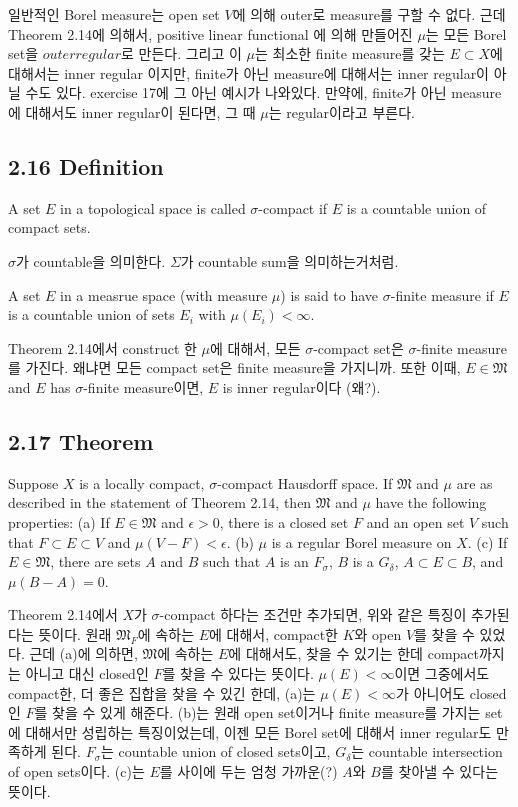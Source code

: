 \documentclass[11pt,reqno]{amsart}
\renewcommand{\(}{\left(}
\renewcommand{\)}{\right)}
\renewcommand{\[}{\left[}
\renewcommand{\]}{\right]}
\newcommand{\ep}{\epsilon}
\newcommand{\M}{\mathfrak{M}}
\begin{document}
일반적인 Borel measure는 open set $V$에 의해 outer로 measure를 구할 수 없다. 근데 Theorem 2.14에 의해서, positive linear functional 에 의해 
만들어진 $\mu$는 모든 Borel set을 $outer regular$로 만든다. 그리고 이 $\mu$는 최소한 finite measure를 갖는 $E \subset X$에 대해서는 inner 
regular 이지만, finite가 아닌 measure에 대해서는 inner regular이 아닐 수도 있다. exercise 17에 그 아닌 예시가 나와있다. 만약에, finite가 아닌
measure에 대해서도 inner regular이 된다면, 그 때 $\mu$는 regular이라고 부른다.

\subsection{2.16 Definition}

A set $E$ in a topological space is called $\sigma$-compact if $E$ is a countable union of compact sets.

$\sigma$가 countable을 의미한다. $\Sigma$가 countable sum을 의미하는거처럼.

A set $E$ in a measrue space (with measure $\mu$) is said to have $\sigma$-finite measure if $E$ is a countable union of sets $E_i$ with 
$\mu(E_i) < \infty$.

Theorem 2.14에서 construct 한 $\mu$에 대해서, 모든 $\sigma$-compact set은 $\sigma$-finite measure를 가진다. 왜냐면 모든 compact set은 finite 
measure을 가지니까. 또한 이때, $E \in \M$ and $E$ has $\sigma$-finite measure이면, $E$ is inner regular이다 (왜?).

\subsection{2.17 Theorem}

Suppose $X$ is a locally compact, $\sigma$-compact Hausdorff space. If $\M$ and $\mu$ are as described in the statement of Theorem 
2.14, then $\M$ and $\mu$ have the following properties:
(a) If $E \in \M$ and $\ep > 0$, there is a closed set $F$ and an open set $V$ such that $F \subset E \subset V$ and $\mu(V - F) < \ep$.
(b) $\mu$ is a regular Borel measure on $X$.
(c) If $E \in \M$, there are sets $A$ and $B$ such that $A$ is an $F_\sigma$, $B$ is a $G_\delta$, $A \subset E \subset B$, and $\mu(B - A) = 0$.

Theorem 2.14에서 $X$가 $\sigma$-compact 하다는 조건만 추가되면, 위와 같은 특징이 추가된다는 뜻이다.
원래 $\M_F$에 속하는 $E$에 대해서, compact한 $K$와 open $V$를 찾을 수 있었다. 근데 (a)에 의하면, $\M$에 속하는 $E$에 대해서도, 찾을 수 있기는 한데 
compact까지는 아니고 대신 closed인 $F$를 찾을 수 있다는 뜻이다. $\mu (E) < \infty$이면 그중에서도 compact한, 더 좋은 집합을 찾을 수 있긴 한데, (a)는 
$\mu (E) < \infty$가 아니어도 closed 인 $F$를 찾을 수 있게 해준다.
(b)는 원래 open set이거나 finite measure를 가지는 set에 대해서만 성립하는 특징이었는데, 이젠 모든 Borel set에 대해서 inner regular도 만족하게 된다.
$F_\sigma$는 countable union of closed sets이고, $G_\delta$는 countable intersection of open sets이다. (c)는 $E$를 사이에 두는 엄청 가까운(?) 
$A$와 $B$를 찾아낼 수 있다는 뜻이다.
\end{document}
